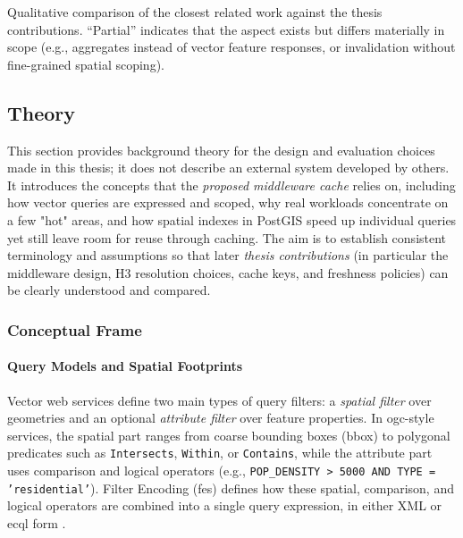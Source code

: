\begin{table}[tbp]
  \centering
  \caption{Qualitative comparison of the closest related work against the thesis contributions. “Partial” indicates that the aspect exists but differs materially in scope (e.g., aggregates instead of vector feature responses, or invalidation without fine-grained spatial scoping).}
  \label{tab:relatedwork-comparison}
  \begingroup
    \small
    \setlength{\tabcolsep}{4pt}
    \renewcommand{\arraystretch}{1.15}
    \begin{adjustbox}{max width=\linewidth}
      
    \end{adjustbox}
  \endgroup
\end{table}

\subsection{Theory}

This section provides background theory for the design and evaluation choices made in this thesis; it does not describe an external system developed by others. It introduces the concepts that the \emph{proposed middleware cache} relies on, including how vector queries are expressed and scoped, why real workloads concentrate on a few "hot" areas, and how spatial indexes in PostGIS speed up individual queries yet still leave room for reuse through caching. The aim is to establish consistent terminology and assumptions so that later \emph{thesis contributions} (in particular the middleware design, H3 resolution choices, cache keys, and freshness policies) can be clearly understood and compared.

\subsubsection{Conceptual Frame}

\paragraph{Query Models and Spatial Footprints}
Vector web services define two main types of query filters: a \emph{spatial filter} over geometries and an optional \emph{attribute filter} over feature properties. In \ac{ogc}-style services, the spatial part ranges from coarse bounding boxes (\ac{bbox}) to polygonal predicates such as \texttt{Intersects}, \texttt{Within}, or \texttt{Contains}, while the attribute part uses comparison and logical operators (e.g., \texttt{POP\_DENSITY > 5000 AND TYPE = 'residential'}). Filter Encoding (\ac{fes}) defines how these spatial, comparison, and logical operators are combined into a single query expression, in either XML or \ac{ecql} form \cite{OGC_FES}.

